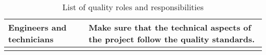 \begin{longtable}[H]{>{\raggedright\arraybackslash}p{5cm} p{9cm}}
	\midrule
	
	Engineers and technicians & Make sure that the technical aspects of the project follow the quality standards. 
	\vspace{0.2cm} \\
	
	\bottomrule[2pt]
	
	\caption{List of quality roles and responsibilities}
	
\end{longtable}